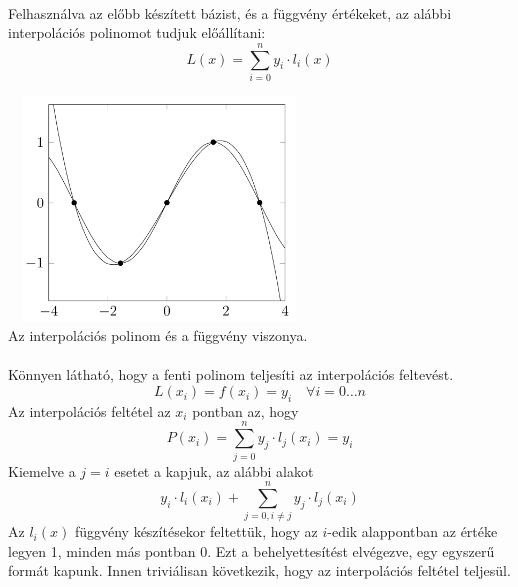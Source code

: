 \documentclass{elteikthesis}
\begin{document}
\paragraph{}
Felhasználva az előbb készített bázist, és a függvény értékeket, az alábbi interpolációs polinomot tudjuk előállítani:$$L(x) = \sum_{i=0}^{n} y_i \cdot l_i(x)$$
\begin{center}
\includegraphics[width=8cm,height=6cm]{pics/polynomial_interpolation}\\
{\footnotesize Az interpolációs polinom és a függvény viszonya.}
\end{center}
\paragraph{}
Könnyen látható, hogy a fenti polinom teljesíti az interpolációs feltevést. $$L(x_i) = f(x_i) = y_i \quad \forall i = 0\dots{n}$$ Az interpolációs feltétel az $x_i$ pontban az, hogy $$P(x_i)=\sum_{j=0}^{n} y_j\cdot l_j(x_i) = y_i$$ Kiemelve a $j = i$ esetet a kapjuk, az alábbi alakot $$y_i \cdot l_i(x_i) + \sum_{j=0, i \neq j}^{n} y_j \cdot l_j(x_i)$$ Az $l_i(x)$ függvény készítésekor feltettük, hogy az $i$-edik alappontban az értéke legyen 1, minden más pontban 0. Ezt a behelyettesítést elvégezve, egy egyszerű formát kapunk. Innen triviálisan következik, hogy az interpolációs feltétel teljesül.
\end{document}
